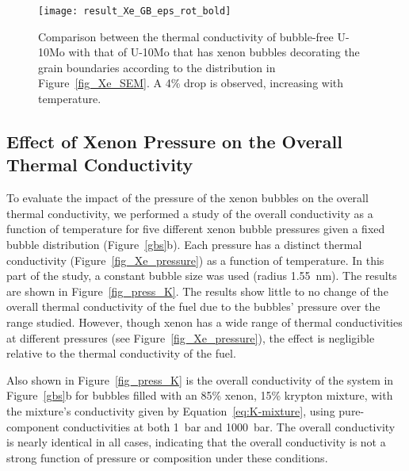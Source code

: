 \begin{figure}
	\centering
	\texttt{[image: result\_Xe\_GB\_eps\_rot\_bold]}
    \caption[Comparison between the thermal conductivity of bubble-free
      \mbox{U-10Mo} with that of \mbox{U-10Mo} that has xenon bubbles
      decorating the grain boundaries according to the distribution in
      Figure~\ref{fig_Xe_SEM}]{Comparison between the thermal conductivity of bubble-free
      \mbox{U-10Mo} with that of \mbox{U-10Mo} that has xenon bubbles
      decorating the grain boundaries according to the distribution in
      Figure~\ref{fig_Xe_SEM}. A 4\% drop is observed, increasing with
      temperature.}
	\label{fig_eff_K_GB}
\end{figure}

\subsection{Effect of Xenon Pressure on the Overall Thermal Conductivity}
\label{subsec:xenonpressure}
To evaluate the impact of the pressure of the xenon bubbles on the overall thermal conductivity, we performed a study of the overall conductivity as a function of temperature for five different xenon bubble pressures given a fixed bubble distribution (Figure~\ref{gbs}b). Each pressure has a distinct thermal conductivity (Figure~\ref{fig_Xe_pressure}) as a function of temperature. In this part of the study, a constant bubble size was used (radius 1.55~nm). The results are shown in Figure~\ref{fig_press_K}. The results show little to no change of the overall thermal conductivity of the fuel due to the bubbles' pressure over the range studied. However, though xenon has a wide range of thermal conductivities at different pressures (see Figure~\ref{fig_Xe_pressure}), the effect is negligible relative to the thermal conductivity of the fuel. 

Also shown in Figure~\ref{fig_press_K} is the overall conductivity of the
system in Figure~\ref{gbs}b for bubbles filled with an 85\% xenon, 15\%
krypton mixture, with the mixture's conductivity given by
Equation~\eqref{eq:K-mixture}, using pure-component conductivities at both
1~bar and 1000~bar.  The overall conductivity is nearly identical
in all cases, indicating that the overall conductivity is not a strong
function of pressure or composition under these conditions.

